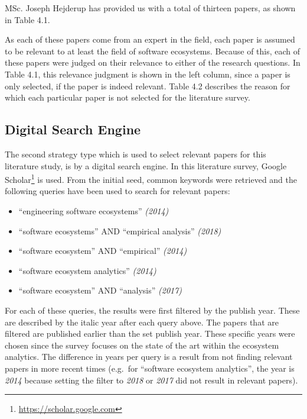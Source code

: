 \documentclass[]{book}
\providecommand{\tightlist}{%
  \setlength{\itemsep}{0pt}\setlength{\parskip}{0pt}}
\let\rmarkdownfootnote\footnote%
\def\footnote{\protect\rmarkdownfootnote}
\begin{document}
MSc. Joseph Hejderup has provided us with a total of thirteen papers, as
shown in Table 4.1.

As each of these papers come from an expert in the field, each paper is
assumed to be relevant to at least the field of software ecosystems.
Because of this, each of these papers were judged on their relevance to
either of the research questions. In Table 4.1, this relevance judgment
is shown in the left column, since a paper is only selected, if the
paper is indeed relevant. Table 4.2 describes the reason for which each
particular paper is not selected for the literature survey.

\subsection{Digital Search Engine}\label{digital-search-engine}

The second strategy type which is used to select relevant papers for
this literature study, is by a digital search engine. In this literature
survey, Google Scholar\footnote{\url{https://scholar.google.com}} is
used. From the initial seed, common keywords were retrieved and the
following queries have been used to search for relevant papers:

\begin{itemize}
\tightlist
\item
  ``engineering software ecosystems'' \emph{(2014)}
\item
  ``software ecosystems'' AND ``empirical analysis'' \emph{(2018)}
\item
  ``software ecosystem'' AND ``empirical'' \emph{(2014)}
\item
  ``software ecosystem analytics'' \emph{(2014)}
\item
  ``software ecosystem'' AND ``analysis'' \emph{(2017)}
\end{itemize}

For each of these queries, the results were first filtered by the
publish year. These are described by the italic year after each query
above. The papers that are filtered are published earlier than the set
publish year. These specific years were chosen since the survey focuses
on the state of the art within the ecosystem analytics. The difference
in years per query is a result from not finding relevant papers in more
recent times (e.g.~for ``software ecosystem analytics'', the year is
\emph{2014} because setting the filter to \emph{2018} or \emph{2017} did
not result in relevant papers).
\end{document}
